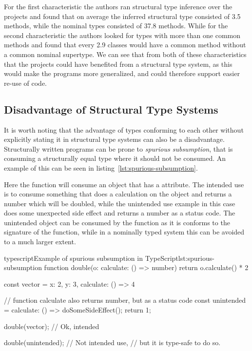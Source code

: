 For the first characteristic the authors ran structural type inference over the projects and found that on average the inferred structural type consisted of 3.5 methods, while the nominal types consisted of 37.8 methods.
While for the second characteristic the authors looked for types with more than one common methods and found that every 2.9 classes would have a common method without a common nominal supertype.
We can see that from both of these characteristics that the projects could have benefited from a structural type system, as this would make the programs more generalized, and could therefore support easier re-use of code.

\subsection{Disadvantage of Structural Type Systems}\label{subsec:disadvantage-of-structural-type-systems}

It is worth noting that the advantage of types conforming to each other without explicitly stating it in structural type systems can also be a disadvantage.
Structurally written programs can be prone to \textit{spurious subsumption}, that is consuming a structurally equal type where it should not be consumed.
An example of this can be seen in listing~\vref{lst:spurious-subsumption}.

Here the function  will consume an object that has a  attribute.
The intended use is to consume something that does a calculation on the object and returns a number which will be doubled, while the unintended use example in this case does some unexpected side effect and returns a number as a status code.
The unintended object can be consumed by the  function as it is conforms to the signature of the function, while in a nominally typed system this can be avoided to a much larger extent.

\begin{code}{typescript}{Example of spurious subsumption in TypeScript}{lst:spurious-subsumption}
    function double(o: {calculate: () => number}) {
        return o.calculate() * 2
    }

    const vector = {
        x: 2,
        y: 3,
        calculate: () => 4
    }

    // function calculate also returns number, but as a status code
    const unintended = {
        calculate: () => {
            doSomeSideEffect();
            return 1;
        }
    }

    double(vector); // Ok, intended

    double(unintended); // Not intended use,
                        // but it is type-safe to do so.

\end{code}

